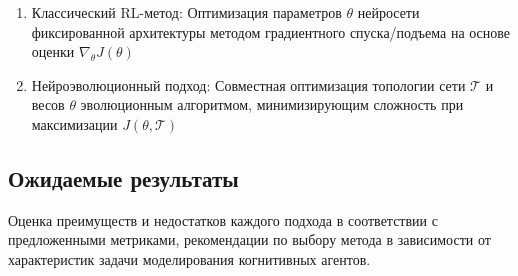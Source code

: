\begin{enumerate}

  \item   Классический RL-метод: Оптимизация параметров $\theta$ нейросети фиксированной архитектуры методом градиентного спуска/подъема на основе оценки $\nabla_{\theta} J(\theta)$
  
  \item   Нейроэволюционный подход: Совместная оптимизация топологии сети $\mathcal{T}$ и весов $\theta$ эволюционным алгоритмом, минимизирующим сложность при максимизации $J(\theta, \mathcal{T})$
  
\end{enumerate}

\subsection{Ожидаемые результаты}

Оценка преимуществ и недостатков каждого подхода в соответствии с предложенными метриками, рекомендации по выбору метода в зависимости от характеристик задачи моделирования когнитивных агентов.